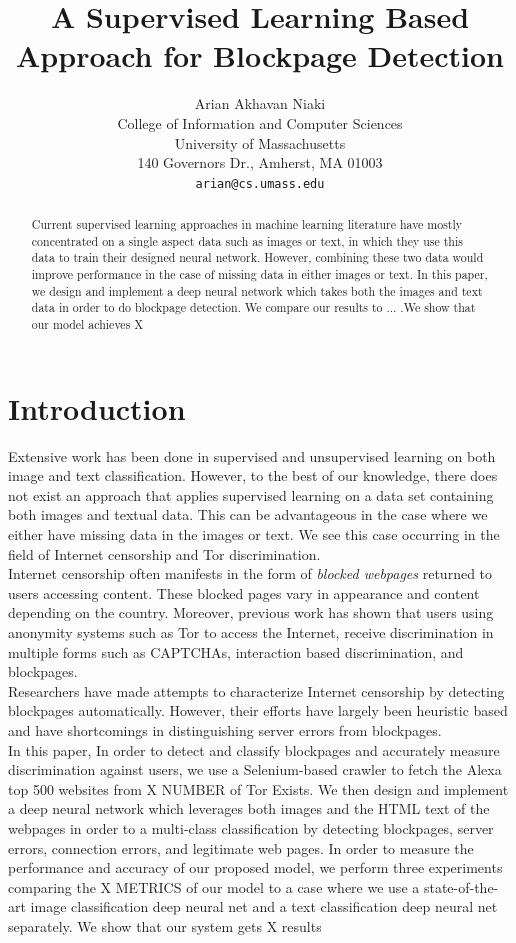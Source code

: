 \documentclass{article} %
\title{A Supervised Learning Based Approach for Blockpage Detection}
\author{
Arian Akhavan Niaki\\
College of Information and Computer Sciences\\
University of Massachusetts\\
140 Governors Dr., Amherst, MA 01003 \\
\texttt{arian@cs.umass.edu} \\
}
\begin{document}
\maketitle

\begin{abstract}
Current supervised learning approaches in machine learning literature have mostly concentrated on a single aspect data such as images or text, in which they use this data to train their designed neural network. However, combining these two data would improve performance in the case of missing data in either images or text. In this paper, we design and implement a deep neural network which takes both the images and text data in order to do blockpage detection. We compare our results to ... .We show that our model achieves X 
\end{abstract}
\section{Introduction}
Extensive work has been done in supervised and unsupervised learning on both image and text classification. However, to the best of our knowledge, there does not exist an approach that applies supervised learning on a data set containing both images and textual data. This can be advantageous in the case where we either have missing data in the images or text. We see this case occurring in the field of Internet censorship and Tor discrimination.\\
Internet censorship often manifests in the form of \emph{blocked webpages} returned to users accessing content. These blocked pages vary in appearance and content depending on the country. 
Moreover, previous work has shown that users using anonymity systems such as Tor to access the Internet, receive discrimination in multiple forms such as CAPTCHAs, interaction based discrimination, and blockpages. \\
Researchers have made attempts to characterize Internet censorship by detecting blockpages automatically. However, their efforts have largely been heuristic based and have shortcomings in distinguishing server errors from blockpages.\\
In this paper, In order to detect and classify blockpages and accurately measure discrimination against users, we use a Selenium-based crawler to fetch the Alexa top 500 websites from X NUMBER of Tor Exists. We then design and implement a deep neural network which leverages both images and the HTML text of the webpages in order to a multi-class classification by detecting blockpages, server errors, connection errors, and legitimate web pages. In order to measure the performance and accuracy of our proposed model, we perform three experiments comparing the X METRICS of our model to a case where we use a state-of-the-art image classification deep neural net and a text classification deep neural net separately. We show that our system gets X results
\end{document}
